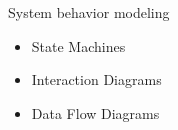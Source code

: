 \begin{Slide}{System behavior modeling}

\begin{itemize}
\item State Machines

\item Interaction Diagrams

\item Data Flow Diagrams


\end{itemize}
\end{Slide}